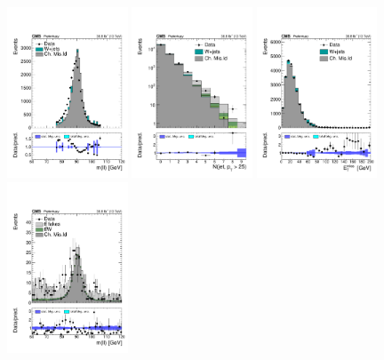 \begin{figure}[htb]
        \centering 
        \includegraphics[width=0.32\textwidth]{ch9_figs/chargeFlip_closureDy/minMllAFAS.pdf}
        \includegraphics[width=0.32\textwidth]{ch9_figs/chargeFlip_closureDy/nJet25.pdf}
        \includegraphics[width=0.32\textwidth]{ch9_figs/chargeFlip_closureDy/met.pdf}\\
        \includegraphics[width=0.32\textwidth]{ch9_figs/chargeFlip_closureTt/minMllAFAS.pdf}

\end{figure}
